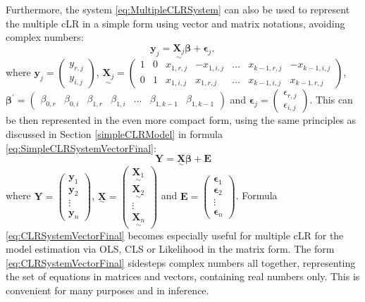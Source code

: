 \documentclass[
]{book}
\begin{document}
Furthermore, the system \eqref{eq:MultipleCLRSystem} can also be used to represent the multiple cLR in a simple form using vector and matrix notations, avoiding complex numbers:
\begin{equation}
    \mathbf{y}_j = \underset{\sim}{\mathbf{X}_j} \boldsymbol{\beta} + \boldsymbol{\epsilon}_j ,
    \label{eq:MultipleCLRSystemVector}
\end{equation}
where \(\mathbf{y}_j = \begin{pmatrix} y_{r,j} \\ y_{i,j} \end{pmatrix}\), \(\underset{\sim}{\mathbf{X}_j} = \begin{pmatrix} 1 & 0 & x_{1,r,j} & -x_{1,i,j} & \dots & x_{k-1,r,j} & -x_{k-1,i,j} \\ 0 & 1 & x_{1,i,j} & x_{1,r,j} & \dots & x_{k-1,i,j} & x_{k-1,r,j} \end{pmatrix}\), \(\boldsymbol{\beta}^\prime = \begin{pmatrix} \beta_{0,r} & \beta_{0,i} & \beta_{1,r} & \beta_{1,i} & \dots & \beta_{1,k-1} & \beta_{1,k-1} \end{pmatrix}\) and \(\mathbf{\epsilon}_j = \begin{pmatrix} \epsilon_{r,j} \\ \epsilon_{i,j} \end{pmatrix}\). This can be then represented in the even more compact form, using the same principles as discussed in Section \ref{simpleCLRModel} in formula \eqref{eq:SimpleCLRSystemVectorFinal}:
\begin{equation}
    \mathbf{Y} = \underset{\sim}{\mathbf{X}} \boldsymbol{\beta} + \mathbf{E} 
    \label{eq:CLRSystemVectorFinal}
\end{equation}
where \(\mathbf{Y}=\begin{pmatrix}\mathbf{y}_1 \\ \mathbf{y}_2\\ \vdots \\ \mathbf{y}_n \end{pmatrix}\), \(\underset{\sim}{\mathbf{X}}=\begin{pmatrix} \underset{\sim}{\mathbf{X}_1} \\ \underset{\sim}{\mathbf{X}_2} \\ \vdots \\ \underset{\sim}{\mathbf{X}_n} \end{pmatrix}\) and \(\mathbf{E}=\begin{pmatrix}\boldsymbol{\epsilon}_1 \\ \boldsymbol{\epsilon}_2\\ \vdots \\ \boldsymbol{\epsilon}_n \end{pmatrix}\). Formula \eqref{eq:CLRSystemVectorFinal} becomes especially useful for multiple cLR for the model estimation via OLS, CLS or Likelihood in the matrix form. The form \eqref{eq:CLRSystemVectorFinal} sidesteps complex numbers all together, representing the set of equations in matrices and vectors, containing real numbers only. This is convenient for many purposes and in inference.
\end{document}

